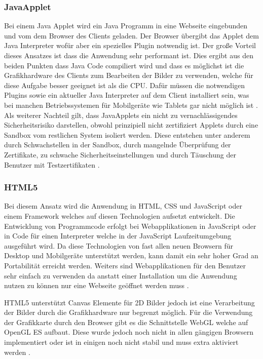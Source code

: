 \subsubsection{JavaApplet}
\label{sec:JavaApplet}
Bei einem Java Applet \cite{japp} wird ein Java Programm in eine Webseite eingebunden und vom dem Browser des Clients geladen.
Der Browser übergibt das Applet dem Java Interpreter wofür aber ein spezielles Plugin notwendig ist. 
%
Der große Vorteil dieses Ansatzes ist dass die Anwendung sehr performant ist.
Dies ergibt aus den beiden Punkten dass Java Code compiliert wird und dass es möglichst ist die Grafikhardware des Clients zum Bearbeiten der Bilder zu verwenden,
welche für diese Aufgabe besser geeignet ist als die CPU.
%
Dafür müssen die notwendigen Plugins sowie ein aktueller Java Interpreter auf dem Client installiert sein, 
was bei manchen Betriebssystemen für Mobilgeräte wie Tablets gar nicht möglich ist \cite{japp}. 
Als weiterer Nachteil gilt, dass JavaApplets ein nicht zu vernachlässigendes Sicherheitsrisiko darstellen,
obwohl prinzipiell nicht zertifiziert Applets durch eine Sandbox vom restlichen System isoliert werden.
Diese entstehen unter anderem durch Schwachstellen in der Sandbox, durch mangelnde Überprüfung der Zertifikate, 
zu schwache Sicherheitseinstellungen und durch Täuschung der Benutzer mit Testzertifikaten \cite{java_risks_cisico, java_risks_bmi}. 


\subsubsection{HTML5}
\label{sec:HTML5}
Bei diesem Ansatz wird die Anwendung in HTML, CSS und JavaScript oder einem Framework welches auf diesen Technologien aufsetzt entwickelt.
Die Entwicklung von Programmcode erfolgt bei Webapplikationen in JavaScript oder in Code für einen Interpreter welche in der JavaScript Laufzeitumgebung ausgeführt wird.
Da diese Technologien von fast allen neuen Browsern für Desktop und Mobilgeräte unterstützt werden, kann damit ein sehr hoher Grad an Portabilität erreicht werden.
Weiters sind Webapplikationen für den Benutzer sehr einfach zu verwenden da anstatt einer Installation um die Anwendung nutzen zu können nur eine Webseite geöffnet werden muss \cite{html}.

HTML5 \cite{html} unterstützt Canvas Elemente für 2D Bilder jedoch ist eine Verarbeitung der Bilder durch die Grafikhardware nur begrenzt möglich.
Für die Verwendung der Grafikkarte durch den Browser gibt es die Schnittstelle WebGL \cite{webgl-14} welche auf OpenGL ES \cite{opengl-es-sepc} aufbaut.
Diese wurde jedoch noch nicht in allen gängigen Browsern implementiert oder ist in einigen noch nicht stabil und muss extra aktiviert werden \cite{webgl-14}.


